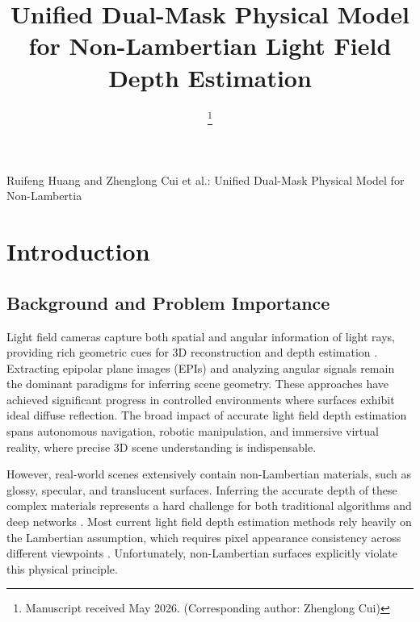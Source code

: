 \documentclass[lettersize,journal]{IEEEtran}
\begin{document}
\title{Unified Dual-Mask Physical Model for Non-Lambertian Light Field Depth Estimation}

\author{
\thanks{Manuscript received May 2026. (Corresponding author: Zhenglong Cui)}}

%
{Ruifeng Huang and Zhenglong Cui et al.: Unified Dual-Mask Physical Model for Non-Lambertia}

\maketitle

\begin{abstract}
\end{abstract}

\begin{IEEEkeywords}
\end{IEEEkeywords}


\section{Introduction}
\subsection{Background and Problem Importance}

Light field cameras capture both spatial and angular information of light rays, providing rich geometric cues for 3D reconstruction and depth estimation \cite{light_field_imaging, depth_estimation}. Extracting epipolar plane images (EPIs) and analyzing angular signals remain the dominant paradigms for inferring scene geometry. These approaches have achieved significant progress in controlled environments where surfaces exhibit ideal diffuse reflection. The broad impact of accurate light field depth estimation spans autonomous navigation, robotic manipulation, and immersive virtual reality, where precise 3D scene understanding is indispensable.

However, real-world scenes extensively contain non-Lambertian materials, such as glossy, specular, and translucent surfaces. Inferring the accurate depth of these complex materials represents a hard challenge for both traditional algorithms and deep networks \cite{non_lambertian_surfaces, specular_reflection}. Most current light field depth estimation methods rely heavily on the Lambertian assumption, which requires pixel appearance consistency across different viewpoints \cite{photo_consistency, lambertian_assumption}. Unfortunately, non-Lambertian surfaces explicitly violate this physical principle. 
\end{document}
